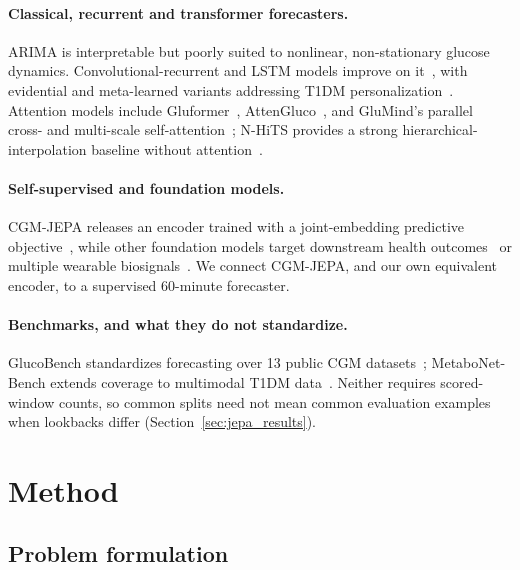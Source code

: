 \documentclass[11pt,a4paper]{article}
\begin{document}
\paragraph{Classical, recurrent and transformer forecasters.}
ARIMA is interpretable but poorly suited to nonlinear, non-stationary glucose dynamics.
Convolutional-recurrent and LSTM models improve on it~\citep{li2020crnn}, with evidential and meta-learned variants addressing T1DM personalization~\citep{zhu2023personalized}.
Attention models include Gluformer~\citep{sergazinov2022gluformer}, AttenGluco~\citep{farahmand2025attengluco}, and GluMind's parallel cross- and multi-scale self-attention~\citep{farahmand2025glumind}; N-HiTS provides a strong hierarchical-interpolation baseline without attention~\citep{challu2023nhits}.

\paragraph{Self-supervised and foundation models.}
CGM-JEPA releases an encoder trained with a joint-embedding predictive objective~\citep{muhammad2026cgmjepa}, while other foundation models target downstream health outcomes~\citep{lutsker2024cgmfm} or multiple wearable biosignals~\citep{abbaspourazad2023biosignal}.
We connect CGM-JEPA, and our own equivalent encoder, to a supervised 60-minute forecaster.

\paragraph{Benchmarks, and what they do not standardize.}
GlucoBench standardizes forecasting over 13 public CGM datasets~\citep{sergazinov2024glucobench}; MetaboNet-Bench extends coverage to multimodal T1DM data~\citep{jeffries2026metabonetbench}.
Neither requires scored-window counts, so common splits need not mean common evaluation examples when lookbacks differ (Section~\ref{sec:jepa_results}).

\section{Method}

\subsection{Problem formulation}
\end{document}
